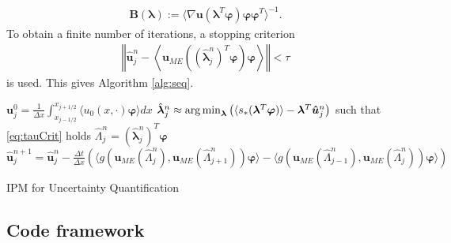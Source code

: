 \begin{align*}
\bm{B}(\bm{\lambda}) := \langle \nabla \bm{u} (\bm{\lambda}^T\bm{\varphi})\bm{\varphi}\bm{\varphi}^T\rangle^{-1}.
\end{align*}
To obtain a finite number of iterations, a stopping criterion 
\begin{align}\label{eq:tauCrit}
\left\Vert \bm{\hat u}_{j}^{n}-\left\langle \bm{u}_{ME}\left(\left(\hat{\bm{\lambda}}_j^n\right)^T\bm{\varphi}\right)\bm{\varphi}\right\rangle \right\Vert < \tau
\end{align}
is used. This gives Algorithm \ref{alg:seq}.

\begin{algorithm}[H]
\begin{algorithmic}[1]
\STATE $\bm{u}_j^0 = \frac{1}{\Delta x} \int_{x_{j-1/ 2}}^{x_{j+1/ 2}} \langle u_0(x, \cdot) \bm{\varphi} \rangle dx$
\ENDFOR
{}
\STATE $\hat{\bm{\lambda}}_j^n \approx \operatorname*{arg\,min}_{\bm{\lambda}}  \left( \langle s_*(\bm{\lambda}^T \bm{\varphi})\rangle - \bm{\lambda}^T \bm{\hat u}_{j}^{n} \right)$
\hfill such that \eqref{eq:tauCrit} holds
\STATE $\hat \Lambda_j^n = \left(\hat{\bm{\lambda}}_j^n\right)^T\bm{\varphi}$
\ENDFOR
{}
\STATE $\bm{\hat u}_{j}^{n+1} = \bm{\hat u}_{j}^{n}- \frac{\Delta t}{\Delta x}\left( \langle g(\bm{u}_{ME}(\hat \Lambda_j^n),\bm{u}_{ME}(\hat \Lambda_{j+1}^n))\bm{\varphi}\rangle - \langle g(\bm{u}_{ME}(\hat \Lambda_{j-1}^n),\bm{u}_{ME}(\hat \Lambda_{j}^n))\bm{\varphi} \rangle\right)$ 
\ENDFOR
\ENDFOR
\end{algorithmic}
\caption{IPM for Uncertainty Quantification}
\label{alg:seq}
\end{algorithm}

\subsection{Code framework}